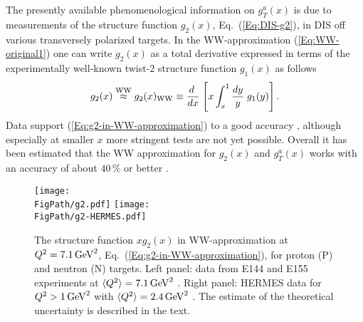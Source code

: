\documentclass[a4paper,11pt]{article}
\newcommand{\be}{\begin{equation}}
\newcommand{\ee}{\end{equation}}
\newcommand{\la}{\langle}
\newcommand{\ra}{\rangle}
\newcommand*{\FigPath}{./figs}%
\begin{document}
The presently available phenomenological information on $g_T^a(x)$ is due 
to measurements of the structure function $g_2(x)$, Eq.~(\ref{Eq:DIS-g2}),
in DIS off various transversely polarized targets. In the WW-approximation 
(\ref{Eq:WW-original1}) one can write $g_2(x)$ as a total derivative
expressed in terms of the experimentally well-known twist-2
structure function $g_1(x)$ as follows
\be
    	g_2(x) \stackrel{\rm WW}{\approx} g_2(x)_{\rm WW} \equiv
	\frac{ d\;}{ d x}\;\Biggl[x\int_x^1\frac{ d y}{y}
	\;g_1(y)\Biggr]\,.\label{Eq:g2-in-WW-approximation}
\ee
Data support (\ref{Eq:g2-in-WW-approximation}) to a good accuracy
\cite{Anthony:2002hy,Adams:1994id,Abe:1998wq,Airapetian:2011wu}, although especially 
at smaller $x$ more stringent tests are not yet possible. Overall it has 
been estimated that the WW approximation for $g_2(x)$ and $g_T^a(x)$ works 
with an accuracy of about $40\,\%$ or better \cite{Accardi:2009au}. 

\begin{figure}[t!]
\centering
\texttt{[image: \\FigPath/g2.pdf]} 
\texttt{[image: \\FigPath/g2-HERMES.pdf]} 
\caption{\label{Fig:g2} 
The structure function $xg_2(x)$ in WW-approximation at $Q^2=7.1\,{\rm GeV}^2$,
Eq.~(\ref{Eq:g2-in-WW-approximation}), for proton (P) and neutron (N) targets. 
Left panel: data from E144 and E155 experiments at 
$\la Q^2\ra=7.1\,{\rm GeV}^2$ \cite{Anthony:2002hy,Abe:1998wq}. 
Right panel: HERMES data for $Q^2>1\,{\rm GeV}^2$ with
$\la Q^2\ra=2.4\,{\rm GeV}^2$ \cite{Airapetian:2011wu}.
The estimate of the theoretical uncertainty is described in the text.}
\end{figure}
\end{document}
